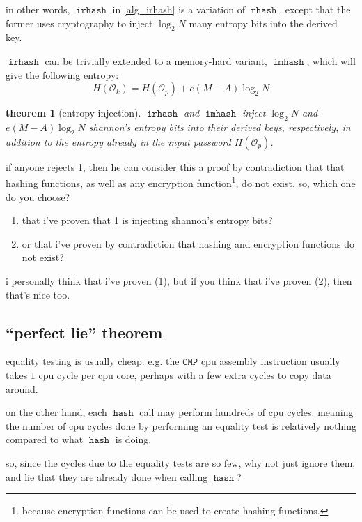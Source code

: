 \documentclass[twocolumn]{article}
\newtheorem{theorem}{theorem}[section]
\DeclareMathOperator{\hash}{\mathtt{hash}}
\DeclareMathOperator{\rhash}{\mathtt{rhash}}
\DeclareMathOperator{\irhash}{\mathtt{irhash}}
\DeclareMathOperator{\imhash}{\mathtt{imhash}}
\begin{document}
in other words, $\irhash$ in \cref{alg_irhash} is a variation of $\rhash$,
except that the former uses cryptography to inject $\log_2 N$ many entropy
bits into the derived key.

$\irhash$ can be trivially extended to a memory-hard variant, $\imhash$,
which will give the following entropy:
\begin{equation}
    H(\mathcal{O}_k) = H(\mathcal{O}_p) + e(M-A)\log_2 N
\end{equation}

\begin{theorem}[entropy injection]\label{theorem_entropy_injection}
    $\irhash$ and $\imhash$ inject $\log_2 N$ and $e(M-A)\log_2 N$
    shannon's entropy bits into their derived keys, respectively, in
    addition to the entropy already in the input password
    $H(\mathcal{O}_p)$.
\end{theorem}

if anyone rejects \cref{theorem_entropy_injection}, then he can consider
this a proof by contradiction that that hashing functions, as well as any
encryption function\footnote{because encryption functions can be used to
create hashing functions.}, do not exist.  so, which one do you choose?  
\begin{enumerate}
    \item that i've proven that \cref{theorem_entropy_injection} is
    injecting shannon's entropy bits?

    \item or that i've proven by contradiction that hashing and encryption
    functions do not exist?
\end{enumerate}

i personally think that i've proven (1), but if you think that i've proven
(2), then that's nice too.

\subsection{``perfect lie'' theorem}
equality testing is usually cheap.  e.g. the $\texttt{CMP}$ cpu assembly
instruction usually takes $1$ cpu cycle per cpu core, perhaps with a few
extra cycles to copy data around.  

on the other hand, each $\hash$ call may perform hundreds of cpu cycles.
meaning the number of cpu cycles done by performing an equality test is
relatively nothing compared to what $\hash$ is doing.

so, since the cycles due to the equality tests are so few, why not just
ignore them, and lie that they are already done when calling $\hash$?
\end{document}
